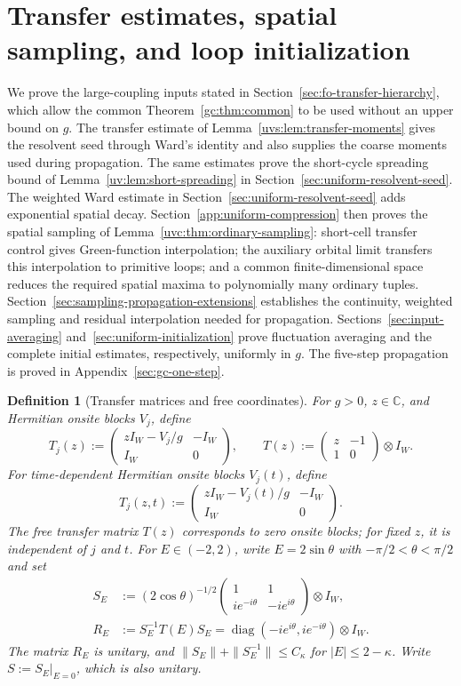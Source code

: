 \documentclass[11pt]{article}
\numberwithin{equation}{section}
\newtheorem{definition}[theorem]{Definition}
\theoremstyle{remark}
\newcommand{\C}{\mathbb C}
\newcommand{\diag}{\operatorname{diag}}
\begin{document}
\section{Transfer estimates, spatial sampling, and loop initialization}
\label{sec:large-proof}\label{sec:input-proofs}
We prove the large-coupling inputs stated in
Section~\ref{sec:fo-transfer-hierarchy}, which allow the common
Theorem~\ref{gc:thm:common} to be used without an upper bound on $g$. The transfer estimate of Lemma~\ref{uvs:lem:transfer-moments} gives the
resolvent seed through Ward's identity and also supplies the coarse moments
used during propagation. The same estimates prove the short-cycle spreading
bound of Lemma~\ref{uv:lem:short-spreading} in
Section~\ref{sec:uniform-resolvent-seed}. The weighted Ward estimate in
Section~\ref{sec:uniform-resolvent-seed} adds exponential spatial decay.
Section~\ref{app:uniform-compression} then proves the spatial sampling
of Lemma~\ref{uvc:thm:ordinary-sampling}:
short-cell transfer control gives Green-function interpolation; the auxiliary
orbital limit transfers this interpolation to primitive loops; and a common
finite-dimensional space reduces the required spatial maxima to polynomially
many ordinary tuples. Section~\ref{sec:sampling-propagation-extensions}
establishes the continuity, weighted sampling and residual interpolation
needed for propagation. Sections~\ref{sec:input-averaging}
and~\ref{sec:uniform-initialization} prove fluctuation averaging and the
complete initial estimates, respectively, uniformly in $g$.
The five-step propagation is proved in
Appendix~\ref{sec:gc-one-step}.

\begin{definition}[Transfer matrices and free coordinates]
\label{def:transfer-matrices}
For $g>0$, $z\in\C$, and Hermitian onsite blocks $V_j$, define
\[
 T_j(z):=\begin{pmatrix}zI_W-V_j/g&-I_W\\I_W&0\end{pmatrix},
 \qquad T(z):=\begin{pmatrix}z&-1\\1&0\end{pmatrix}\otimes I_W.
\]
For time-dependent Hermitian onsite blocks $V_j(t)$, define
\[
 T_j(z,t):=\begin{pmatrix}zI_W-V_j(t)/g&-I_W\\I_W&0\end{pmatrix}.
\]
The free transfer matrix $T(z)$ corresponds to zero onsite blocks;
for fixed $z$, it is independent of $j$ and $t$.
For $E\in(-2,2)$, write $E=2\sin\theta$ with $-\pi/2<\theta<\pi/2$ and set
\[
 \begin{aligned}
 S_E&:=(2\cos\theta)^{-1/2}
       \begin{pmatrix}1&1\\ie^{-i\theta}&-ie^{i\theta}\end{pmatrix}
       \otimes I_W,\\
 R_E&:=S_E^{-1}T(E)S_E
       =\diag(-ie^{i\theta},ie^{-i\theta})\otimes I_W.
 \end{aligned}
\]
The matrix $R_E$ is unitary, and
$\|S_E\|+\|S_E^{-1}\|\le C_\kappa$ for $|E|\le2-\kappa$.
Write $S:=S_E|_{E=0}$, which is also unitary.
\end{definition}
\end{document}
